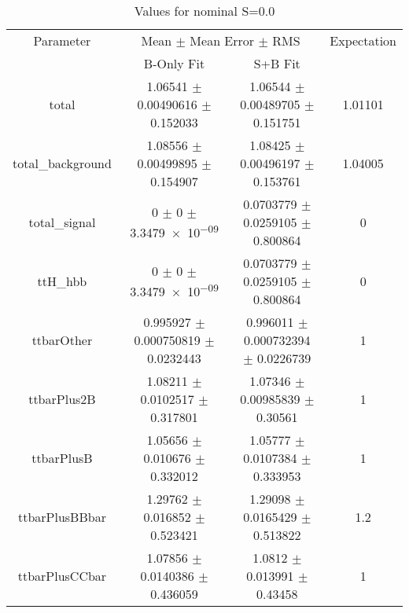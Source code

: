 \begin{table}
\centering
\caption{Values for nominal S=0.0}
\begin{tabular}{cccc}
\toprule
Parameter & \multicolumn{2}{c}{Mean $\pm$ Mean Error $\pm$ RMS} & Expectation\\
 & B-Only Fit & S+B Fit & \\
\midrule
total & \num{1.06541} $\pm$ \num{0.00490616} $\pm$ \num{0.152033} & \num{1.06544} $\pm$ \num{0.00489705} $\pm$ \num{0.151751} & \num{1.01101}\\
total\_background & \num{1.08556} $\pm$ \num{0.00499895} $\pm$ \num{0.154907} & \num{1.08425} $\pm$ \num{0.00496197} $\pm$ \num{0.153761} & \num{1.04005}\\
total\_signal & \num{0} $\pm$ \num{0} $\pm$ \num{3.3479e-09} & \num{0.0703779} $\pm$ \num{0.0259105} $\pm$ \num{0.800864} & \num{0}\\
ttH\_hbb & \num{0} $\pm$ \num{0} $\pm$ \num{3.3479e-09} & \num{0.0703779} $\pm$ \num{0.0259105} $\pm$ \num{0.800864} & \num{0}\\
ttbarOther & \num{0.995927} $\pm$ \num{0.000750819} $\pm$ \num{0.0232443} & \num{0.996011} $\pm$ \num{0.000732394} $\pm$ \num{0.0226739} & \num{1}\\
ttbarPlus2B & \num{1.08211} $\pm$ \num{0.0102517} $\pm$ \num{0.317801} & \num{1.07346} $\pm$ \num{0.00985839} $\pm$ \num{0.30561} & \num{1}\\
ttbarPlusB & \num{1.05656} $\pm$ \num{0.010676} $\pm$ \num{0.332012} & \num{1.05777} $\pm$ \num{0.0107384} $\pm$ \num{0.333953} & \num{1}\\
ttbarPlusBBbar & \num{1.29762} $\pm$ \num{0.016852} $\pm$ \num{0.523421} & \num{1.29098} $\pm$ \num{0.0165429} $\pm$ \num{0.513822} & \num{1.2}\\
ttbarPlusCCbar & \num{1.07856} $\pm$ \num{0.0140386} $\pm$ \num{0.436059} & \num{1.0812} $\pm$ \num{0.013991} $\pm$ \num{0.43458} & \num{1}\\
\bottomrule
\end{tabular}
\end{table}